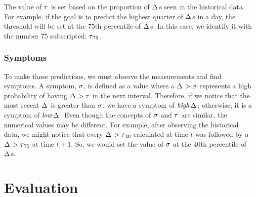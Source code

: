 \documentclass{llncs}
\newcommand{\ourDelta}[2][]{\ensuremath{\Delta\textsuperscript{\text{#1}}
\textsubscript{\text{#2}}}}
\newcommand{\high}[1][ ]{\ensuremath{\text{\emph{high}}#1}}
\newcommand{\low}[1][ ]{\ensuremath{\text{\emph{low}}#1}}
\newcommand{\highDelta}[2][]{\high{\ourDelta[#1]{#2}}}
\newcommand{\lowDelta}[2][]{\low{\ourDelta[#1]{#2}}}
\newcommand{\threshold}[1][]{\ensuremath{\tau\textsubscript{#1}}}
\newcommand{\symptom}[1][]{\ensuremath{\sigma\textsubscript{#1}}}
\begin{document}
The value of \threshold{} is set based on the proportion of \ourDelta{}s seen 
in the historical data. For example, if the goal is to predict the highest 
quarter of \ourDelta{}s in a day, the threshold will be set at the $75$th 
percentile of \ourDelta{}s. In this case, we identify it with the number $75$ 
subscripted: \threshold[75].
\begin{comment}
As an example, Figure~\ref{fig:plot_rectangles} shows the measurements of the 
temperature and relative humidity sensors done during a day, 
and the blue background represents the intervals with \highDelta{RH}s, 
considering \threshold[70]. During these intervals, the \emph{Network B} should 
have 
activated a plan to report more data and produced more detailed 
information, since significant changes in the environment are 
generally more interesting and critical to report.


\begin{figure}[h]
	\centering
	\texttt{[image: plot\_rectangles2]}
	\caption{Values observed during a day.}
	\label{fig:plot_rectangles}
\end{figure}
\end{comment}

\subsubsection{Symptoms}
\label{sec:symptom-definition}

To make those predictions, we must observe the measurements and find 
symptoms. A symptom, \symptom{}, is defined as a value where a 
$\ourDelta{} > \symptom{}$ represents a high probability of having 
$\ourDelta{} > \threshold{}$ in the next interval. Therefore, if we 
notice that the most recent \ourDelta{} is greater than \symptom{}, we have a 
symptom of \highDelta{}; otherwise, it is a symptom of \lowDelta{}.
Even though the concepts of \symptom{} and \threshold{} are similar, the 
numerical values may be different. For example, after observing the historical 
data, we might notice that every $\ourDelta{} > \threshold[40]$ calculated at 
time $t$ was followed by a $\ourDelta{} > \threshold[75]$ at time $t + 1$. So, 
we would set the value of \symptom{} at the $40$th percentile of \ourDelta{}s.



\section{Evaluation}
\label{sec:evaluation}
\end{document}
